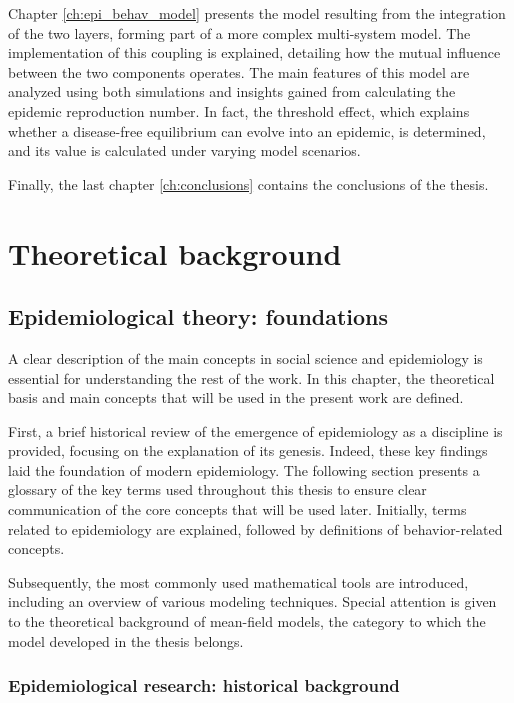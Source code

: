 Chapter \ref{ch:epi_behav_model} presents the model resulting from the integration of the two layers, forming part of a more complex multi-system model. The implementation of this coupling is explained, detailing how the mutual influence between the two components operates. The main features of this model are analyzed using both simulations and insights gained from calculating the epidemic reproduction number. In fact, the threshold effect, which explains whether a disease-free equilibrium can evolve into an epidemic, is determined, and its value is calculated under varying model scenarios.

Finally, the last chapter \ref{ch:conclusions} contains the conclusions of the thesis. 
\chapter{Theoretical background}
\label{ch:theo_back}
\section{Epidemiological theory: foundations}

A clear description of the main concepts in social science and epidemiology is essential for understanding the rest of the work. In this chapter, the theoretical basis and main concepts that will be used in the present work are defined. 

First, a brief historical review of the emergence of epidemiology as a discipline is provided, focusing on the explanation of its genesis. Indeed, these key findings laid the foundation of modern  epidemiology. 
The following section presents a glossary of the key terms used throughout this thesis to ensure clear communication of the core concepts that will be used later. Initially, terms related to epidemiology are explained, followed by definitions of behavior-related concepts.

Subsequently, the most commonly used mathematical tools are introduced, including an overview of various modeling techniques. Special attention is given to the theoretical background of mean-field models, the category to which the model developed in the thesis belongs.

\subsection{Epidemiological research: historical background}
\label{subsec:history}

